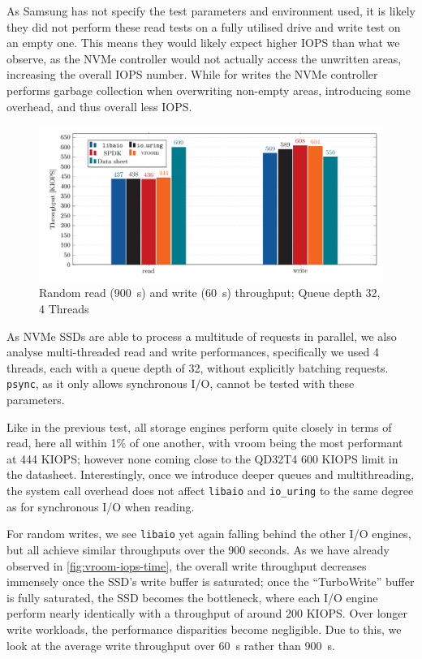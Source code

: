 As Samsung has not specify the test parameters and environment used, it is likely they did not perform these read tests on a fully utilised drive and write test on an empty one. This means they would likely expect higher IOPS than what we observe, as the NVMe controller would not actually access the unwritten areas, increasing the overall IOPS number. While for writes the NVMe controller performs garbage collection when overwriting non-empty areas, introducing some overhead, and thus overall less IOPS.


\begin{figure}
  \centering
    \includegraphics[width=\textwidth]{figures/iops-qd32-ybar}
    \caption{Random read (\qty{900}{\second}) and write (\qty{60}{\second}) throughput; Queue depth 32, 4 Threads}
    \label{fig:iops-qd32}
\end{figure}

As NVMe SSDs are able to process a multitude of requests in parallel, we also analyse multi-threaded read and write performances, specifically we used 4 threads, each with a queue depth of 32, without explicitly batching requests. \texttt{psync}, as it only allows synchronous I/O, cannot be tested with these parameters.

Like in the previous test, all storage engines perform quite closely in terms of read, here all within 1\% of one another, with vroom being the most performant at 444 KIOPS; however none coming close to the QD32T4 600 KIOPS limit in the datasheet. Interestingly, once we introduce deeper queues and multithreading, the system call overhead does not affect \texttt{libaio} and \texttt{io\_uring} to the same degree as for synchronous I/O when reading.

For random writes, we see \texttt{libaio} yet again falling behind the other I/O engines, but all achieve similar throughputs over the 900 seconds. As we have already observed in \autoref{fig:vroom-iops-time}, the overall write throughput decreases immensely once the SSD's write buffer is saturated; once the ``TurboWrite'' buffer is fully saturated, the SSD becomes the bottleneck, where each I/O engine perform nearly identically with a throughput of around 200 KIOPS. Over longer write workloads, the performance disparities become negligible. Due to this, we look at the average write throughput over \qty{60}{\second} rather than \qty{900}{\second}.

